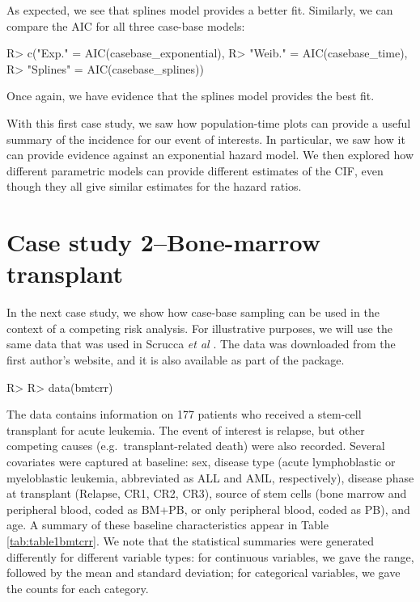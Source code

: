 \documentclass[
]{jss}
\begin{document}
As expected, we see that splines model provides a better fit. Similarly,
we can compare the AIC for all three case-base models:

\begin{CodeChunk}

\begin{CodeInput}
R> c("Exp." = AIC(casebase_exponential),
R>   "Weib." = AIC(casebase_time),
R>   "Splines" = AIC(casebase_splines))
\end{CodeInput}
\end{CodeChunk}

Once again, we have evidence that the splines model provides the best
fit.

With this first case study, we saw how population-time plots can provide
a useful summary of the incidence for our event of interests. In
particular, we saw how it can provide evidence against an exponential
hazard model. We then explored how different parametric models can
provide different estimates of the CIF, even though they all give
similar estimates for the hazard ratios.

\hypertarget{case-study-2bone-marrow-transplant}{%
\section{Case study 2--Bone-marrow
transplant}\label{case-study-2bone-marrow-transplant}}

In the next case study, we show how case-base sampling can be used in
the context of a competing risk analysis. For illustrative purposes, we
will use the same data that was used in Scrucca \emph{et al}
\citeyearpar{scrucca2010regression}. The data was downloaded from the
first author's website, and it is also available as part of the
 package.

\begin{CodeChunk}

\begin{CodeInput}
R> 
R> data(bmtcrr)
\end{CodeInput}
\end{CodeChunk}

The data contains information on 177 patients who received a stem-cell
transplant for acute leukemia. The event of interest is relapse, but
other competing causes (e.g.~transplant-related death) were also
recorded. Several covariates were captured at baseline: sex, disease
type (acute lymphoblastic or myeloblastic leukemia, abbreviated as ALL
and AML, respectively), disease phase at transplant (Relapse, CR1, CR2,
CR3), source of stem cells (bone marrow and peripheral blood, coded as
BM+PB, or only peripheral blood, coded as PB), and age. A summary of
these baseline characteristics appear in Table \ref{tab:table1bmtcrr}.
We note that the statistical summaries were generated differently for
different variable types: for continuous variables, we gave the range,
followed by the mean and standard deviation; for categorical variables,
we gave the counts for each category.
\end{document}
